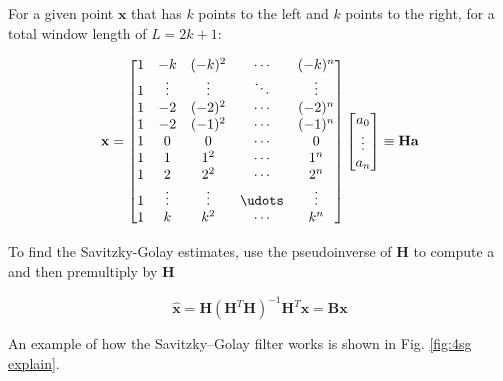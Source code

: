 For a given point $\textbf{x}$ that has $k$ points to the left and $k$ points to the right, for a total window length of $L = 2k + 1$:
\vspace*{0.5cm}

$$\textbf{x}= 
\begin{bmatrix}
    1 & -k & (-k)^2 & \cdots & (-k)^n\\ 
    1 & \vdots &\vdots & \ddots & \vdots\\  
    1 & -2 & (-2)^2 & \cdots & (-2)^n\\  
    1 & -2 & (-1)^2 & \cdots & (-1)^n\\  
    1 & 0 & 0 & \cdots & 0\\   
    1 & 1 & 1^2 & \cdots & 1^n\\   
    1 & 2 & 2^2 & \cdots & 2^n\\    
    1 & \vdots &\vdots & \udots & \vdots\\   
    1 & k & k^2 & \cdots & k^n\\   
  \end{bmatrix}
  \begin{bmatrix}
    a_0\\ 
    \vdots \\  
    a_n 
  \end{bmatrix}
\equiv
  \textbf{Ha}
  $$
  \vspace*{0.5cm}


  To find the Savitzky-Golay estimates, use the pseudoinverse of $\textbf{H}$ to compute a and then premultiply by $\textbf{H}$
  \vspace*{0.5cm}

$$
\hat{\textbf{x}} = \textbf{H}(\textbf{H}^\textit{T}\textbf{H})^{-1}\textbf{H}^\textit{T}\textbf{x} = \textbf{Bx} 
$$ 

\vspace*{0.5cm}

An example of how the Savitzky–Golay filter works is shown in Fig. \ref{fig:4sg explain}.

